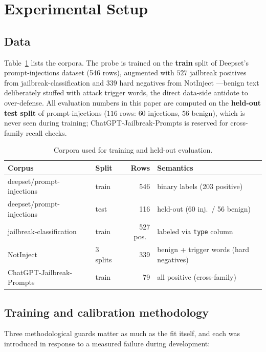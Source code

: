 \documentclass[conference]{IEEEtran}
\begin{document}
\section{Experimental Setup}
\label{sec:setup}

\subsection{Data}
\label{sec:data}
Table~\ref{tab:data} lists the corpora. The probe is trained on the
\textbf{train} split of Deepset's prompt-injections dataset
(546 rows), augmented with $527$ jailbreak positives from
jailbreak-classification and $339$ hard negatives from NotInject
\cite{li2025}---benign text deliberately stuffed with attack trigger words,
the direct data-side antidote to over-defense. All evaluation numbers in this
paper are computed on the \textbf{held-out test split} of
prompt-injections ($116$ rows: $60$ injections, $56$ benign), which is never
seen during training; ChatGPT-Jailbreak-Prompts is reserved for cross-family
recall checks.

\begin{table}[!t]
\caption{Corpora used for training and held-out evaluation.}
\label{tab:data}
\centering
\begin{tabular}{@{}l l r l@{}}
\toprule
\textbf{Corpus} & \textbf{Split} & \textbf{Rows} & \textbf{Semantics}\\
\midrule
deepset/prompt-injections & train & 546 & binary labels (203 positive)\\
deepset/prompt-injections & test & 116 & held-out (60 inj.\ / 56 benign)\\
jailbreak-classification & train & 527 pos.\ & labeled via \texttt{type} column\\
NotInject \cite{li2025} & 3 splits & 339 & benign + trigger words (hard negatives)\\
ChatGPT-Jailbreak-Prompts & train & 79 & all positive (cross-family)\\
\bottomrule
\end{tabular}
\end{table}

\subsection{Training and calibration methodology}
\label{sec:training}
Three methodological guards matter as much as the fit itself, and each was
introduced in response to a measured failure during development:
\end{document}
